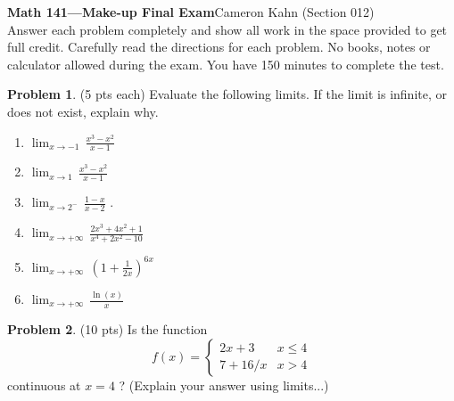 \documentclass[12pt,letterpaper]{amsart}
\theoremstyle{definition}
\newtheorem{problem}{Problem}[]
\begin{document}
\noindent \textbf{Math 141---Make-up Final Exam}\hspace{4cm}Cameron Kahn (Section 012)\\



\noindent Answer each problem completely and show all work in the space
provided to get full credit.  Carefully read the directions for each problem.
No books, notes or calculator allowed during the exam.  You have 150 minutes to complete the test.\\

\begin{problem}(5 pts each)
Evaluate the following limits. If the limit is infinite, or does not exist, explain why.
\begin{enumerate}
 \item $\displaystyle \lim_{x\to -1}\, \frac{x^3-x^2}{x-1}$
\vskip 2.25in

 \item $\displaystyle \lim_{x\to 1}\, \frac{x^3-x^2}{x-1}$
\vskip 2.25in

 \item $\displaystyle \lim_{x\to 2^-}\, \frac{1-x}{x-2}$
\vskip 2in
.


\item $\displaystyle \lim_{x\to +\infty}\, \frac{2x^3+4x^2+1}{x^4+2x^2 -10}$
\vskip 3in

 \item $\displaystyle \lim_{x\to +\infty}\, \left(1+\frac{1}{2x}\right)^{6x}$
\vskip 3in

 \item $\displaystyle \lim_{x\to +\infty}\, \frac{\ln(x)}{x}$
\vskip 3in


\end{enumerate}

\end{problem}
\vspace{2in}

\begin{problem}(10 pts)
Is the function \begin{equation*}
  f(x)=\begin{cases}
2x+3 & x\leq 4\\
7+16/x &x>4
\end{cases}                     
                      \end{equation*}
continuous at $x=4$ ? (Explain your answer using limits...)

\end{problem}
\vskip 3in
\end{document}

